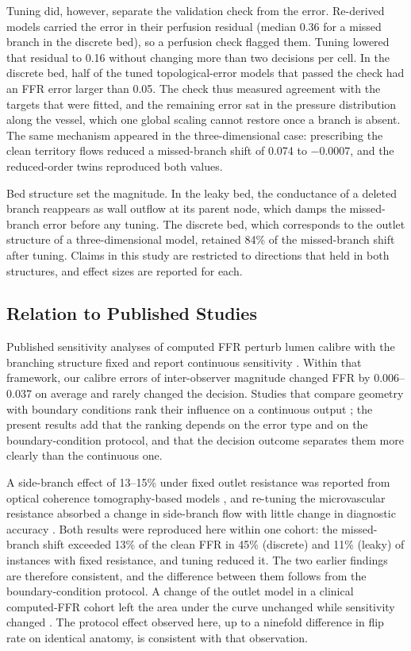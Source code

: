 \documentclass[journal]{IEEEtran}
\begin{document}
Tuning did, however, separate the validation check from the error. Re-derived models carried the error in their
perfusion residual (median 0.36 for a missed branch in the discrete bed), so a perfusion check flagged them. Tuning
lowered that residual to 0.16 without changing more than two decisions per cell. In the discrete bed, half of the
tuned topological-error models that passed the check had an FFR error larger than 0.05. The check thus measured
agreement with the targets that were fitted, and the remaining error sat in the pressure distribution along the
vessel, which one global scaling cannot restore once a branch is absent. The same mechanism appeared in the
three-dimensional case: prescribing the clean territory flows reduced a missed-branch shift of 0.074 to $-0.0007$,
and the reduced-order twins reproduced both values.

Bed structure set the magnitude. In the leaky bed, the conductance of a deleted branch reappears as wall outflow at
its parent node, which damps the missed-branch error before any tuning. The discrete bed, which corresponds to the
outlet structure of a three-dimensional model, retained 84\% of the missed-branch shift after tuning. Claims in this
study are restricted to directions that held in both structures, and effect sizes are reported for each.

\subsection{Relation to Published Studies}
Published sensitivity analyses of computed FFR perturb lumen calibre with the branching structure fixed and report
continuous sensitivity \cite{sankaran2015tmi,sankaran2015cmame,fernandez2024,dalmaso2025}. Within that framework, our
calibre errors of inter-observer magnitude changed FFR by 0.006--0.037 on average and rarely changed the decision. Studies that compare
geometry with boundary conditions rank their influence on a continuous output \cite{sankaran2016,tanade2022,korte2023};
the present results add that the ranking depends on the error type and on the boundary-condition protocol, and that
the decision outcome separates them more clearly than the continuous one.

A side-branch effect of 13--15\% under fixed outlet resistance was reported from optical coherence tomography-based
models \cite{gamage2022}, and re-tuning the microvascular resistance absorbed a change in side-branch flow with little change in diagnostic
accuracy \cite{gosling2020}.
Both results were reproduced here within one cohort: the missed-branch shift exceeded 13\% of the clean FFR in 45\%
(discrete) and 11\% (leaky) of instances with fixed resistance, and tuning reduced it. The two earlier findings are
therefore consistent, and the difference between them follows from the boundary-condition protocol. A change of the
outlet model in a clinical computed-FFR cohort left the area under the curve unchanged while sensitivity changed
\cite{fossan2026}. The protocol effect observed here, up to a ninefold difference in flip rate on identical anatomy, is
consistent with that observation.
\end{document}
